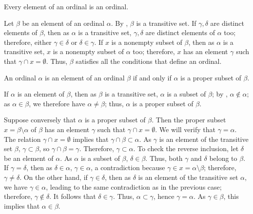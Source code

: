 \documentclass{article}
\begin{document}
\begin{theorem}
  \label{thm:5qmhh3to}
  Every element of an ordinal is an ordinal.
\end{theorem}

Let \(\beta\) be an element of an ordinal \(\alpha\).  By
, \(\beta\) is a transitive set.  If
\(\gamma, \delta\) are distinct elements of \(\beta\), then as
\(\alpha\) is a transitive set, \(\gamma, \delta\) are distinct
elements of \(\alpha\) too; therefore, either \(\gamma \in \delta\) or
\(\delta \in \gamma\).  If \(x\) is a nonempty subset of \(\beta\),
then as \(\alpha\) is a transitive set, \(x\) is a nonempty subset of
\(\alpha\) too; therefore, \(x\) has an element \(\gamma\) such that
\(\gamma \cap x = \emptyset\).  Thus, \(\beta\) satisfies all the
conditions that define an ordinal.

\begin{theorem}
  \label{thm:lebsg6gf}
  An ordinal \(\alpha\) is an element of an ordinal \(\beta\) if and
  only if \(\alpha\) is a proper subset of \(\beta\).
\end{theorem}

If \(\alpha\) is an element of \(\beta\), then as \(\beta\) is a
transitive set, \(\alpha\) is a subset of \(\beta\); by
, \(\alpha \notin \alpha\); as
\(\alpha \in \beta\), we therefore have \(\alpha \neq \beta\); thus,
\(\alpha\) is a proper subset of \(\beta\).

Suppose conversely that \(\alpha\) is a proper subset of \(\beta\).
Then the proper subset \(x = \beta \setminus \alpha\) of \(\beta\) has
an element \(\gamma\) such that \(\gamma \cap x = \emptyset\).  We
will verify that \(\gamma = \alpha\).  The relation
\(\gamma \cap x = \emptyset\) implies that
\(\gamma \cap \beta \subset \alpha\).  As \(\gamma\) is an element of
the transitive set \(\beta\), \(\gamma \subset \beta\), so
\(\gamma \cap \beta = \gamma\).  Therefore, \(\gamma \subset \alpha\).
To check the reverse inclusion, let \(\delta\) be an element of
\(\alpha\).  As \(\alpha\) is a subset of \(\beta\),
\(\delta \in \beta\).  Thus, both \(\gamma\) and \(\delta\) belong to
\(\beta\).  If \(\gamma = \delta\), then as \(\delta \in \alpha\),
\(\gamma \in \alpha\), a contradiction because
\(\gamma \in x = \alpha \setminus \beta\); therefore,
\(\gamma \neq \delta\).  On the other hand, if \(\gamma \in \delta\),
then as \(\delta\) is an element of the transitive set \(\alpha\), we
have \(\gamma \in \alpha\), leading to the same contradiction as in
the previous case; therefore, \(\gamma \notin \delta\).  It follows
that \(\delta \in \gamma\).  Thus, \(\alpha \subset \gamma\), hence
\(\gamma = \alpha\).  As \(\gamma \in \beta\), this implies that
\(\alpha \in \beta\).
\end{document}
